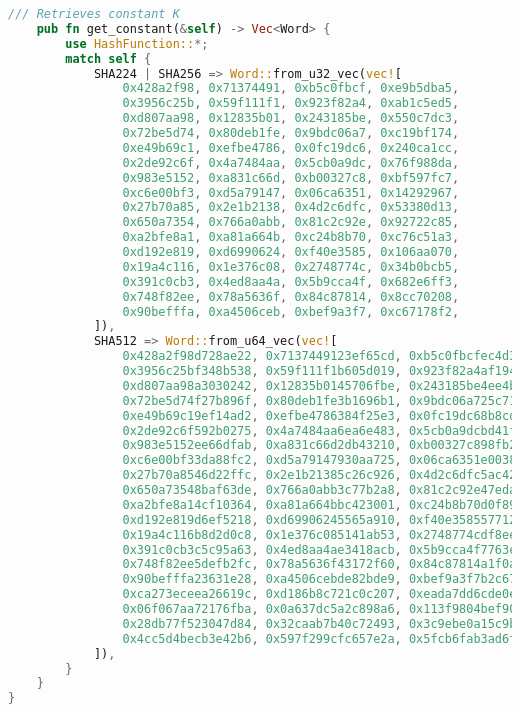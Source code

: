 \begin{lstlisting}[language=rust, caption={structs/hash\_function.rs}]
	/// Retrieves constant K
	pub fn get_constant(&self) -> Vec<Word> {
		use HashFunction::*;
		match self {
			SHA224 | SHA256 => Word::from_u32_vec(vec![
				0x428a2f98, 0x71374491, 0xb5c0fbcf, 0xe9b5dba5,
				0x3956c25b, 0x59f111f1, 0x923f82a4, 0xab1c5ed5,
				0xd807aa98, 0x12835b01, 0x243185be, 0x550c7dc3,
				0x72be5d74, 0x80deb1fe, 0x9bdc06a7, 0xc19bf174,
				0xe49b69c1, 0xefbe4786, 0x0fc19dc6, 0x240ca1cc,
				0x2de92c6f, 0x4a7484aa, 0x5cb0a9dc, 0x76f988da,
				0x983e5152, 0xa831c66d, 0xb00327c8, 0xbf597fc7,
				0xc6e00bf3, 0xd5a79147, 0x06ca6351, 0x14292967,
				0x27b70a85, 0x2e1b2138, 0x4d2c6dfc, 0x53380d13,
				0x650a7354, 0x766a0abb, 0x81c2c92e, 0x92722c85,
				0xa2bfe8a1, 0xa81a664b, 0xc24b8b70, 0xc76c51a3,
				0xd192e819, 0xd6990624, 0xf40e3585, 0x106aa070,
				0x19a4c116, 0x1e376c08, 0x2748774c, 0x34b0bcb5,
				0x391c0cb3, 0x4ed8aa4a, 0x5b9cca4f, 0x682e6ff3,
				0x748f82ee, 0x78a5636f, 0x84c87814, 0x8cc70208,
				0x90befffa, 0xa4506ceb, 0xbef9a3f7, 0xc67178f2,
			]),
			SHA512 => Word::from_u64_vec(vec![
				0x428a2f98d728ae22, 0x7137449123ef65cd, 0xb5c0fbcfec4d3b2f, 0xe9b5dba58189dbbc,
				0x3956c25bf348b538, 0x59f111f1b605d019, 0x923f82a4af194f9b, 0xab1c5ed5da6d8118,
				0xd807aa98a3030242, 0x12835b0145706fbe, 0x243185be4ee4b28c, 0x550c7dc3d5ffb4e2,
				0x72be5d74f27b896f, 0x80deb1fe3b1696b1, 0x9bdc06a725c71235, 0xc19bf174cf692694,
				0xe49b69c19ef14ad2, 0xefbe4786384f25e3, 0x0fc19dc68b8cd5b5, 0x240ca1cc77ac9c65,
				0x2de92c6f592b0275, 0x4a7484aa6ea6e483, 0x5cb0a9dcbd41fbd4, 0x76f988da831153b5,
				0x983e5152ee66dfab, 0xa831c66d2db43210, 0xb00327c898fb213f, 0xbf597fc7beef0ee4,
				0xc6e00bf33da88fc2, 0xd5a79147930aa725, 0x06ca6351e003826f, 0x142929670a0e6e70,
				0x27b70a8546d22ffc, 0x2e1b21385c26c926, 0x4d2c6dfc5ac42aed, 0x53380d139d95b3df,
				0x650a73548baf63de, 0x766a0abb3c77b2a8, 0x81c2c92e47edaee6, 0x92722c851482353b,
				0xa2bfe8a14cf10364, 0xa81a664bbc423001, 0xc24b8b70d0f89791, 0xc76c51a30654be30,
				0xd192e819d6ef5218, 0xd69906245565a910, 0xf40e35855771202a, 0x106aa07032bbd1b8,
				0x19a4c116b8d2d0c8, 0x1e376c085141ab53, 0x2748774cdf8eeb99, 0x34b0bcb5e19b48a8,
				0x391c0cb3c5c95a63, 0x4ed8aa4ae3418acb, 0x5b9cca4f7763e373, 0x682e6ff3d6b2b8a3,
				0x748f82ee5defb2fc, 0x78a5636f43172f60, 0x84c87814a1f0ab72, 0x8cc702081a6439ec,
				0x90befffa23631e28, 0xa4506cebde82bde9, 0xbef9a3f7b2c67915, 0xc67178f2e372532b,
				0xca273eceea26619c, 0xd186b8c721c0c207, 0xeada7dd6cde0eb1e, 0xf57d4f7fee6ed178,
				0x06f067aa72176fba, 0x0a637dc5a2c898a6, 0x113f9804bef90dae, 0x1b710b35131c471b,
				0x28db77f523047d84, 0x32caab7b40c72493, 0x3c9ebe0a15c9bebc, 0x431d67c49c100d4c,
				0x4cc5d4becb3e42b6, 0x597f299cfc657e2a, 0x5fcb6fab3ad6faec, 0x6c44198c4a475817,
			]),
		}
	}
}
\end{lstlisting}

